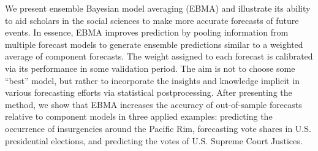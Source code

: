  We present ensemble Bayesian model averaging (EBMA) and illustrate
  its ability to aid scholars in the social sciences to make more
  accurate forecasts of future events.  In essence, EBMA improves
  prediction by pooling information from multiple forecast models to
  generate ensemble predictions similar to a weighted average of
  component forecasts. The weight assigned to each forecast is
  calibrated via its performance in some validation period. The aim is
  not to choose some ``best'' model, but rather to incorporate the
  insights and knowledge implicit in various forecasting efforts via
  statistical postprocessing.  After presenting the method, we show
  that EBMA increases the accuracy of out-of-sample forecasts relative
  to component models in three applied examples: predicting the
  occurrence of insurgencies around the Pacific Rim, forecasting vote
  shares in U.S. presidential elections, and predicting the votes of
  U.S. Supreme Court Justices.